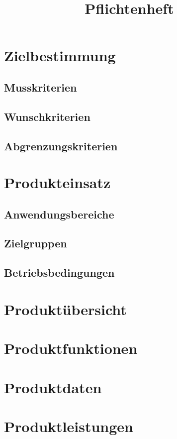 \documentclass[12pt, a4paper]{article}
\title{Pflichtenheft}
\begin{document}
\maketitle
\pagebreak
\tableofcontents
\pagebreak

\section{Zielbestimmung}
\subsection{Musskriterien}
\subsection{Wunschkriterien}
\subsection{Abgrenzungskriterien}
\pagebreak

\section{Produkteinsatz}
\subsection{Anwendungsbereiche}
\subsection{Zielgruppen}
\subsection{Betriebsbedingungen}
\pagebreak

\section{Produktübersicht}
\pagebreak

\section{Produktfunktionen}
\pagebreak

\section{Produktdaten}
\pagebreak

\section{Produktleistungen}
\pagebreak
\end{document}
